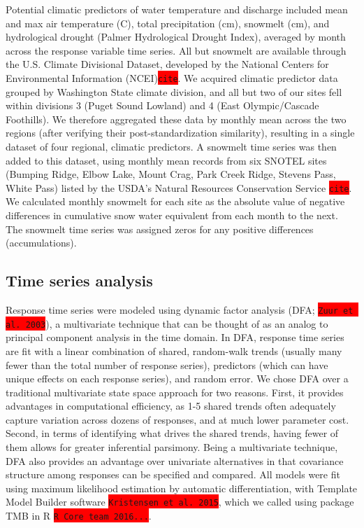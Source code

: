 \documentclass{article}
\begin{document}
Potential climatic predictors of water temperature and discharge included mean and max air temperature (\degree C), total precipitation (cm), snowmelt (cm), and hydrological drought (Palmer Hydrological Drought Index), averaged by month across the response variable time series. All but snowmelt are available through the U.S. Climate Divisional Dataset, developed by the National Centers for Environmental Information (NCEI)\colorbox{red}{\lstinline{cite}}. We acquired climatic predictor data grouped by Washington State climate division, and all but two of our sites fell within divisions 3 (Puget Sound Lowland) and 4 (East Olympic/Cascade Foothills). We therefore aggregated these data by monthly mean across the two regions (after verifying their post-standardization similarity), resulting in a single dataset of four regional, climatic predictors. A snowmelt time series was then added to this dataset, using monthly mean records from six SNOTEL sites (Bumping Ridge, Elbow Lake, Mount Crag, Park Creek Ridge, Stevens Pass, White Pass) listed by the USDA's Natural Resources Conservation Service \colorbox{red}{\lstinline{cite}}. We calculated monthly snowmelt for each site as the absolute value of negative differences in cumulative snow water equivalent from each month to the next. The snowmelt time series was assigned zeros for any positive differences (accumulations).


\subsection*{Time series analysis}
Response time series were modeled using dynamic factor analysis (DFA; \colorbox{red}{\lstinline{Zuur et al. 2003}}), a multivariate technique that can be thought of as an analog to principal component analysis in the time domain. In DFA, response time series are fit with a linear combination of shared, random-walk trends (usually many fewer than the total number of response series), predictors (which can have unique effects on each response series), and random error. We chose DFA over a traditional multivariate state space approach for two reasons. First, it provides advantages in computational efficiency, as 1-5 shared trends often adequately capture variation across dozens of responses, and at much lower parameter cost. Second, in terms of identifying what drives the shared trends, having fewer of them allows for greater inferential parsimony. Being a multivariate technique, DFA also provides an advantage over univariate alternatives in that covariance structure among responses can be specified and compared. All models were fit using maximum likelihood estimation by automatic differentiation, with Template Model Builder software \colorbox{red}{\lstinline{Kristensen et al. 2015}}, which we called using package TMB in R \colorbox{red}{\lstinline{R Core team 2016...}}.
\end{document}
